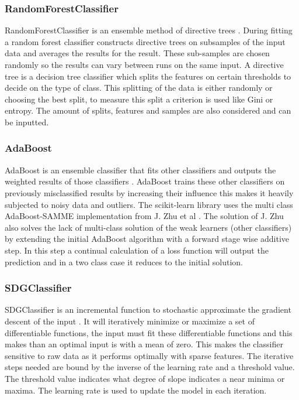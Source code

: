 \documentclass[a4paper,10pt]{article}
\begin{document}
\subsubsection{RandomForestClassifier}
RandomForestClassifier is an ensemble method of directive trees \cite{RDF}. During fitting a random forest classifier constructs directive trees on subsamples of the input data and averages the results for the result. These sub-samples are chosen randomly so the results can vary between runs on the same input. A directive tree is a decision tree classifier which splits the features on certain thresholds to decide on the type of class. This splitting of the data is either randomly or choosing the best split, to measure this split a criterion is used like Gini or entropy. The amount of splits, features and samples are also considered and can be inputted. 

\subsubsection{AdaBoost}
AdaBoost is an ensemble classifier that fits other classifiers and outputs the weighted results of those classifiers \cite{AdaBoost}. AdaBoost trains these other classifiers on previously misclassified results by increasing their influence this makes it heavily subjected to noisy data and outliers. The scikit-learn library uses the multi class AdaBoost-SAMME implementation from J. Zhu et al \cite{MadaB}. The solution of J. Zhu also solves the lack of multi-class solution of the weak learners (other classifiers) by extending the initial AdaBoost algorithm with a forward stage wise additive step. In this step a continual calculation of a loss function will output the prediction and in a two class case it reduces to the initial solution.

\subsubsection{SDGClassifier}
SDGClassifier is an incremental function to stochastic approximate the gradient descent of the input \cite{SGDClass}. It will iteratively minimize or maximize a set of differentiable functions, the input must fit these differentiable functions and this makes than an optimal input is with a mean of zero.  This makes the classifier sensitive to raw data as it performs optimally with sparse features. The iterative steps needed are bound by the inverse of the learning rate and a threshold value. The threshold value indicates what degree of slope indicates a near minima or maxima. The learning rate is used to update the model in each iteration.
\end{document}

